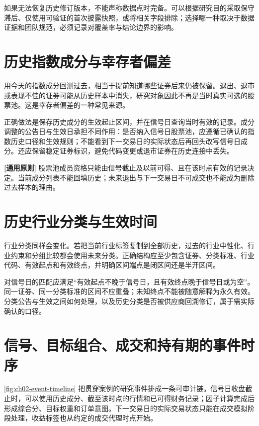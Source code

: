 如果无法恢复历史修订版本，不能声称数据点时完备。可以根据研究目的采取保守滞后、仅使用可验证的首次披露快照，或将相关字段排除；选择哪一种取决于数据证据和团队规范，必须记录对覆盖率与结论边界的影响。

\section{历史指数成分与幸存者偏差}

用今天的指数成分回测过去，相当于提前知道哪些证券后来仍被保留。退出、退市或表现不佳的证券可能从历史样本中消失，研究对象因此不再是当时真实可选的股票池。这是幸存者偏差的一种常见来源。

正确做法是保存历史成分的生效起止区间，并在信号日查询当时有效的记录。成分调整的公告日与生效日承担不同作用：是否纳入信号日股票池，应遵循已确认的指数历史口径和生效规则；不能看到下一交易日的实际状态后再回头改写信号日成分。还应保留稳定证券标识，避免代码变更或退市证券在历史连接中丢失。

\begin{principlebox}
\textbf{[通用原则]} 股票池成员资格只能由信号截止及以前可得、且在该时点有效的记录决定。当前成分列表不能回填历史；未来退出与下一交易日不可成交也不能成为删除过去样本的理由。
\end{principlebox}

\section{历史行业分类与生效时间}

行业分类同样会变化。若把当前行业标签复制到全部历史，过去的行业中性化、行业约束和分组比较都会使用未来分类。正确结构应至少包含证券、分类标准、行业代码、有效起点和有效终点，并明确区间端点是闭区间还是半开区间。

对信号日的匹配应满足“有效起点不晚于信号日，且有效终点晚于信号日或为空”。同一证券、同一分类标准的区间不应重叠；未知终点不能被随意解释为永久有效。分类公告与生效之间如何处理，以及历史分类是否被供应商回溯修订，属于需实际确认的口径。

\section{信号、目标组合、成交和持有期的事件时序}

\cref{fig:ch02-event-timeline} 把贯穿案例的研究事件排成一条可审计链。信号日收盘截止时，可以使用历史成分、截至该时点的行情和已可得财务记录；因子计算完成后形成综合分、目标权重和订单意图。下一交易日的实际交易状态只能在成交模拟阶段处理，收益标签也从约定的成交代理时点开始。

